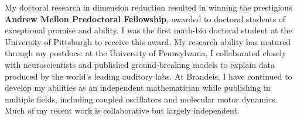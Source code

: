 My doctoral research in dimension reduction resulted in winning the prestigious \textbf{Andrew Mellon Predoctoral Fellowship}, awarded to doctoral students of exceptional promise and ability. I was the first math-bio doctoral student at the University of Pittsburgh to receive this award. My research ability has matured through my postdocs: at the University of Pennsylvania, I collaborated closely with neuroscientists and published ground-breaking models to explain data produced by the world's leading auditory labs. At Brandeis, I have continued to develop my abilities as an independent mathematician while publishing in multiple fields, including coupled oscillators and molecular motor dynamics. Much of my recent work is collaborative but largely independent.